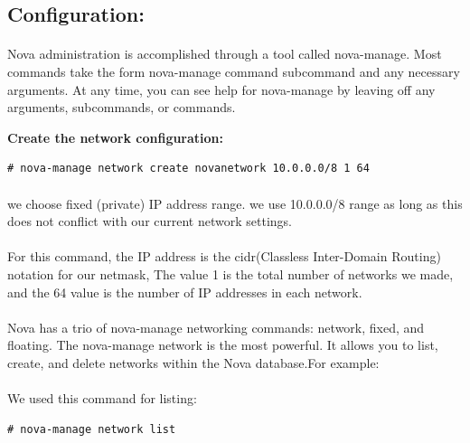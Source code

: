 \subsection{Configuration:}
\paragraph{}Nova administration is accomplished through a tool called nova-manage. 
Most commands take the form nova-manage command subcommand and any necessary arguments. At any time, 
you can see help for nova-manage by leaving off any arguments, subcommands, or commands.\par

\textbf{Create the network configuration:}

\begin{lstlisting}[language={[Latex]TeX}, frame=single]
# nova-manage network create novanetwork 10.0.0.0/8 1 64
\end{lstlisting}
\paragraph{}we choose fixed (private) IP address range. 
we use 10.0.0.0/8 range as long as this does not conflict with our current network settings. 
\paragraph{}For this command, the IP address is the cidr(Classless Inter-Domain Routing) notation for our netmask,
The value 1 is the total number of networks we made, and the 64 value is the number of IP addresses in each network. 

\paragraph{}Nova has a trio of nova-manage networking commands: network, fixed, and floating. The nova-manage network is the most powerful. 
It allows you to list, create, and delete networks within the Nova database.For example:\par
\paragraph{}We used this command for listing:\par

\begin{lstlisting}[language={[Latex]TeX}, frame=single]
# nova-manage network list
\end{lstlisting}

